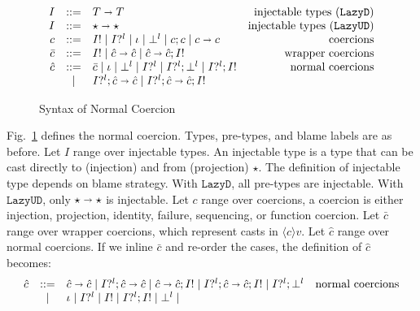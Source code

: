\documentclass[acmsmall,review,anonymous]{acmart}\settopmatter{printfolios=true,printccs=false,printacmref=false}
\newcommand{\figref}[1]{Fig.~\ref{#1}}
\newcommand{\stxrule}[3]{#1 & ::= & #3 & \text{#2}\\}
\newcommand{\stxrulecont}[1]{& | & #1 & \\}
\newcommand{\plus}[0]{+}
\newcommand{\lazyUD}{$\mathtt{Lazy UD}$}
\newcommand{\lazyD}{$\mathtt{Lazy D}$}
\newcommand{\TOOdyn}[0]{\star}
\newcommand{\POOfun}[2]{#1 \shortrightarrow #2}
\newcommand{\POOprod}[2]{#1 \times #2}
\newcommand{\POOsum}[2]{#1 \plus #2}
\newcommand{\vOOcast}[2]{\langle#2\rangle#1}
\newcommand{\ncProj}[2]{#1?^{#2}}
\newcommand{\ncInj}[1]{#1!}
\newcommand{\ncId}[0]{\iota}
\newcommand{\ncSeq}[2]{#1;#2}
\newcommand{\ncFail}[1]{\bot^{#1}}
\newcommand{\ncFun}[2]{\POOfun{#1}{#2}}
\newcommand{\ncProd}[2]{\POOprod{#1}{#2}}
\newcommand{\ncSum}[2]{\POOsum{#1}{#2}}
\begin{document}
\begin{figure}
	\[
	\begin{array}{rclr}
	\stxrule{I}{injectable types (\lazyD)}{
		\POOfun{T}{T}}
	\stxrule{I}{injectable types (\lazyUD)}{
		\POOfun{\TOOdyn}{\TOOdyn}
	}
	\stxrule{c}{coercions}{
		\ncInj{I} \mid
		\ncProj{I}{l} \mid
		\ncId \mid
		\ncFail{l} \mid
		\ncSeq{c}{c} \mid
		\ncFun{c}{c}
	}
	\stxrule{\bar{c}}{wrapper coercions}{	
		\ncInj{I} \mid
		\ncFun{\hat{c}}{\hat{c}} \mid
		\ncSeq{\ncFun{\hat{c}}{\hat{c}}}{\ncInj{I}}
	}
	\stxrule{\hat{c}}{normal coercions}{
		\bar{c} \mid
		\ncId \mid
		\ncFail{l} \mid
		\ncProj{I}{l} \mid
		\ncSeq{\ncProj{I}{l}}{\ncFail{l}} \mid
		\ncSeq{\ncProj{I}{l}}{\ncInj{I}}
	}
	\stxrulecont{
		\ncSeq{\ncProj{I}{l}}{\ncFun{\hat{c}}{\hat{c}}} \mid
		\ncSeq{\ncProj{I}{l}}{\ncSeq{\ncFun{\hat{c}}{\hat{c}}}{\ncInj{I}}}
	}
	\end{array}
	\]
	\caption{Syntax of Normal Coercion}
	\label{fig:normal-coercion}
\end{figure}


\figref{fig:normal-coercion} defines the normal coercion.
Types, pre-types, and blame labels are as before.
Let $ I $ range over injectable types. An injectable type is a type that can 
be cast directly to (injection) and from (projection) $ \TOOdyn $. The 
definition of injectable type depends on blame strategy. With \lazyD, all 
pre-types are injectable. With \lazyUD, only $ \POOfun{\TOOdyn}{\TOOdyn} $ 
is injectable. 
Let $ c $ range over coercions, a coercion is either injection, projection, 
identity, failure, sequencing, or function coercion.
Let $ \bar{c} $ range over wrapper coercions, which represent casts in $ 
\vOOcast{v}{c} $.
Let $ \hat{c} $ range over normal coercions. If we inline $ \bar{c} $ and 
re-order the cases, the definition of $ \hat{c} $ becomes:
\[
\begin{array}{rclr}
\stxrule{\hat{c}}{normal coercions}{
	\ncFun{\hat{c}}{\hat{c}} \mid
	\ncSeq{\ncProj{I}{l}}{\ncFun{\hat{c}}{\hat{c}}} \mid
	\ncSeq{\ncFun{\hat{c}}{\hat{c}}}{\ncInj{I}} \mid
	\ncSeq{\ncProj{I}{l}}{\ncSeq{\ncFun{\hat{c}}{\hat{c}}}{\ncInj{I}}} \mid
	\ncSeq{\ncProj{I}{l}}{\ncFail{l}}
}
\stxrulecont{
	\ncId \mid
	\ncProj{I}{l} \mid
	\ncInj{I} \mid
	\ncSeq{\ncProj{I}{l}}{\ncInj{I}} \mid
	\ncFail{l} \mid
}
\end{array}
\]
\end{document}
